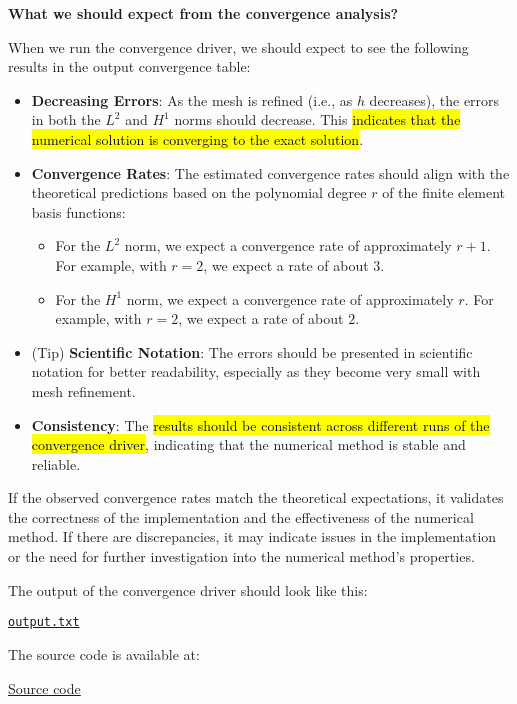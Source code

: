 \highspace
\begin{flushleft}
    \textcolor{Green3}{ \textbf{What we should expect from the convergence analysis?}}
\end{flushleft}
When we run the convergence driver, we should expect to see the following results in the output convergence table:
\begin{itemize}
    \item \textbf{Decreasing Errors}: As the mesh is refined (i.e., as $h$ decreases), the errors in both the $L^2$ and $H^1$ norms should decrease. This \hl{indicates that the numerical solution is converging to the exact solution}.
    \item \textbf{Convergence Rates}: The estimated convergence rates should align with the theoretical predictions based on the polynomial degree $r$ of the finite element basis functions:
    \begin{itemize}
        \item For the $L^2$ norm, we expect a convergence rate of approximately $r + 1$. For example, with $r = 2$, we expect a rate of about $3$.
        \item For the $H^1$ norm, we expect a convergence rate of approximately $r$. For example, with $r = 2$, we expect a rate of about $2$.
    \end{itemize}
    \item (Tip) \textbf{Scientific Notation}: The errors should be presented in scientific notation for better readability, especially as they become very small with mesh refinement.
    \item \textbf{Consistency}: The \hl{results should be consistent across different runs of the convergence driver}, indicating that the numerical method is stable and reliable.
\end{itemize}
If the observed convergence rates match the theoretical expectations, it validates the correctness of the implementation and the effectiveness of the numerical method. If there are discrepancies, it may indicate issues in the implementation or the need for further investigation into the numerical method's properties.

\highspace
The output of the convergence driver should look like this: 
\begin{center}
    \href{https://gist.github.com/AndreVale69/08f1b087ab991b1bc70fdd99b77f02dd#file-output-txt}{\texttt{output.txt}}
    \hspace{1em}
\end{center}

\noindent
The source code is available at:
\begin{center}
    \href{https://gist.github.com/AndreVale69/08f1b087ab991b1bc70fdd99b77f02dd}{Source code}
    \hspace{1em}
\end{center}